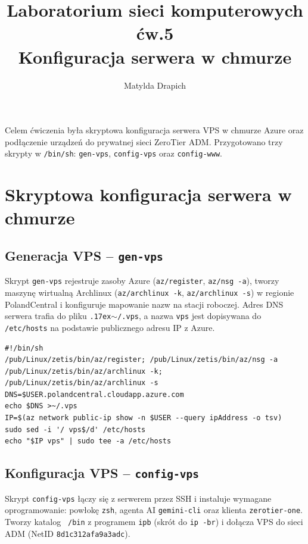 \documentclass[a4paper,10pt]{article}
\author{Matylda Drapich}
\title{Laboratorium sieci komputerowych\\ćw.5\\Konfiguracja serwera w chmurze}
\newcommand\TY{\raise.17ex\hbox{$\scriptstyle\mathtt{\sim}$}}
\begin{document}
\thispagestyle{empty}
\maketitle

\vspace{-0.5em}
Celem ćwiczenia była skryptowa konfiguracja serwera VPS w chmurze Azure
oraz podłączenie urządzeń do prywatnej sieci ZeroTier ADM.
Przygotowano trzy skrypty w \texttt{/bin/sh}: \texttt{gen-vps}, \texttt{config-vps}
oraz \texttt{config-www}.

\section{Skryptowa konfiguracja serwera w chmurze}

\subsection{Generacja VPS -- \texttt{gen-vps}}

Skrypt \texttt{gen-vps} rejestruje zasoby Azure (\texttt{az/register}, \texttt{az/nsg -a}),
tworzy maszynę wirtualną Archlinux (\texttt{az/archlinux -k}, \texttt{az/archlinux -s})
w regionie PolandCentral i konfiguruje mapowanie nazw na stacji roboczej.
Adres DNS serwera trafia do pliku \texttt{\TY/.vps}, a nazwa \texttt{vps} jest dopisywana
do \texttt{/etc/hosts} na podstawie publicznego adresu IP z Azure.

\begin{lstlisting}
#!/bin/sh
/pub/Linux/zetis/bin/az/register; /pub/Linux/zetis/bin/az/nsg -a
/pub/Linux/zetis/bin/az/archlinux -k; /pub/Linux/zetis/bin/az/archlinux -s
DNS=$USER.polandcentral.cloudapp.azure.com
echo $DNS >~/.vps
IP=$(az network public-ip show -n $USER --query ipAddress -o tsv)
sudo sed -i '/ vps$/d' /etc/hosts
echo "$IP vps" | sudo tee -a /etc/hosts
\end{lstlisting}

\subsection{Konfiguracja VPS -- \texttt{config-vps}}

Skrypt \texttt{config-vps} łączy się z serwerem przez SSH i instaluje
wymagane oprogramowanie: powłokę \texttt{zsh}, agenta AI \texttt{gemini-cli}
oraz klienta \texttt{zerotier-one}. Tworzy katalog \texttt{~/bin} z programem
\texttt{ipb} (skrót do \texttt{ip -br}) i dołącza VPS do sieci ADM
(NetID \texttt{8d1c312afa9a3adc}).
\end{document}
